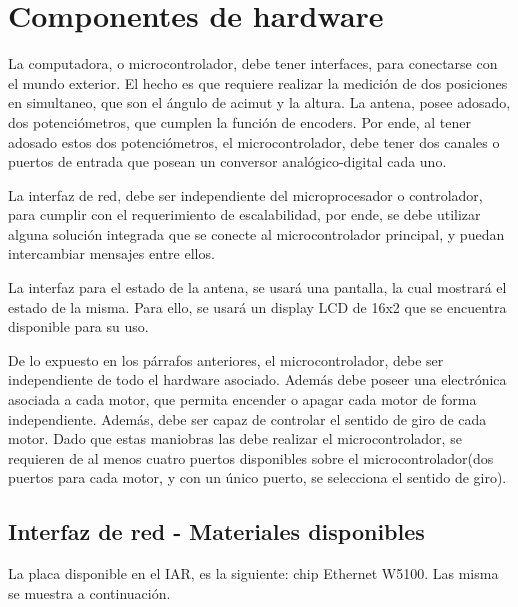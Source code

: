 \section{Componentes de hardware} \label{Sec_CompH}


La computadora, o microcontrolador, debe tener interfaces, para conectarse con el mundo exterior. El hecho es que requiere realizar la medición de dos posiciones en simultaneo, que son el ángulo de acimut y la altura. La antena, posee adosado, dos potenciómetros, que cumplen la función de encoders. Por ende, al tener adosado estos dos potenciómetros, el microcontrolador, debe tener dos canales o puertos de entrada que posean un conversor analógico-digital cada uno. 

La interfaz de red, debe ser independiente del microprocesador o controlador, para cumplir con el requerimiento de escalabilidad, por ende, se debe utilizar alguna solución integrada que se conecte al microcontrolador principal, y puedan intercambiar mensajes entre ellos. 

La interfaz para el estado de la antena, se usará una pantalla, la cual mostrará el estado de la misma. Para ello, se usará un display LCD de 16x2 que se encuentra disponible para su uso.


De lo expuesto en los párrafos anteriores, el microcontrolador, debe ser independiente de todo el hardware asociado. Además debe poseer una electrónica asociada a cada motor, que permita encender o apagar cada motor de forma independiente. Además, debe ser capaz de controlar el sentido de giro de cada motor. Dado que estas maniobras las debe realizar el microcontrolador, se requieren de al menos cuatro puertos disponibles sobre el microcontrolador(dos puertos para cada motor, y con un único puerto, se selecciona el sentido de giro). 


\subsection{Interfaz de red - Materiales disponibles}\label{Int_r} 

La placa disponible en el IAR, es la siguiente: chip Ethernet W5100. Las misma se muestra a continuación. 

